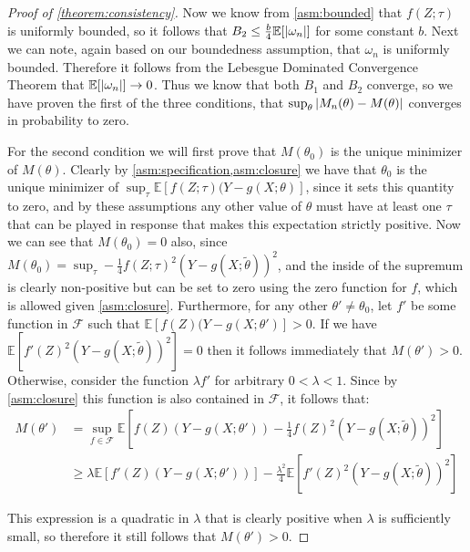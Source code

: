 \documentclass{article}
\theoremstyle{plain}
\theoremstyle{definition}
\begin{document}
\begin{proof}[Proof of \cref{theorem:consistency}]
Now we know from \cref{asm:bounded} that $f(Z;\tau)$ is uniformly bounded, so it follows that $B_2 \leq \frac{b}{4} \mathbb{E}[\left|\omega_n\right|]$ for some constant $b$. Next we can note, again based on our boundedness assumption, that $\omega_n$ is uniformly bounded. Therefore it follows from the Lebesgue Dominated Convergence Theorem that $\mathbb{E}[\left|\omega_n\right|] \rightarrow 0$. Thus we know that both $B_1$ and $B_2$ converge, so we have proven the first of the three conditions, that $\sup_{\theta}\left|M_n(\theta) - M(\theta)\right|$ converges in probability to zero.

For the second condition we will first prove that $M(\theta_0)$ is the unique minimizer of $M(\theta)$. Clearly by \cref{asm:specification,asm:closure} we have that $\theta_0$ is the unique minimizer of $\sup_{\tau}\mathbb{E}[f(Z;\tau)(Y - g(X;\theta)]$, since it sets this quantity to zero, and by these assumptions any other value of $\theta$ must have at least one $\tau$ that can be played in response that makes this expectation strictly positive. Now we can see that $M(\theta_0) = 0$ also, since $M(\theta_0) = \sup_{\tau} -\frac{1}{4} f(Z;\tau)^2 (Y - g(X;\tilde\theta))^2$, and the inside of the supremum is clearly non-positive but can be set to zero using the zero function for $f$, which is allowed given \cref{asm:closure}. Furthermore, for any other $\theta' \neq \theta_0$, let $f'$ be some function in $\mathcal{F}$ such that $\mathbb{E}[f(Z)(Y - g(X;\theta')] > 0$. If we have $\mathbb{E}[f'(Z)^2(Y - g(X;\tilde\theta))^2] = 0$ then it follows immediately that $M(\theta') > 0$. Otherwise, consider the function $\lambda f'$ for arbitrary $0 < \lambda < 1$. Since by \cref{asm:closure} this function is also contained in $\mathcal{F}$, it follows that:
\begin{align}
    M(\theta') &= \sup_{f \in \mathcal{F}} \mathbb{E}[f(Z)(Y - g(X;\theta')) - \frac{1}{4} f(Z)^2(Y - g(X;\tilde\theta))^2] \nonumber \\
    &\geq  \lambda\mathbb{E}[ f'(Z)(Y - g(X;\theta'))] - \frac{\lambda^2}{4}\mathbb{E}[ f'(Z)^2(Y - g(X;\tilde\theta))^2] \nonumber 
\end{align}

This expression is a quadratic in $\lambda$ that is clearly positive when $\lambda$ is sufficiently small, so therefore it still follows that $M(\theta') > 0$.


\end{proof}
\end{document}
